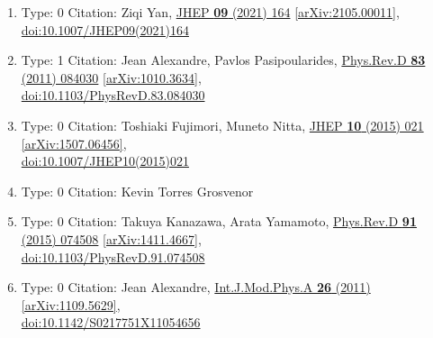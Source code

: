 \documentclass[a4paper,10pt]{article}
\begin{document}
\begin{enumerate}
\begin{enumerate}
  \item Type: 0 Citation: Ziqi Yan, \href{https://www.doi.org/10.1007/JHEP09(2021)164}{JHEP {\bf 09} (2021) 164}  \href{https://arxiv.org/abs/2105.00011}{[arXiv:2105.00011]},\\\href{https://www.doi.org/10.1007/JHEP09(2021)164}{doi:10.1007/JHEP09(2021)164}
  \item Type: 1 Citation: Jean Alexandre, Pavlos Pasipoularides, \href{https://www.doi.org/10.1103/PhysRevD.83.084030}{Phys.Rev.D {\bf 83} (2011) 084030}  \href{https://arxiv.org/abs/1010.3634}{[arXiv:1010.3634]},\\\href{https://www.doi.org/10.1103/PhysRevD.83.084030}{doi:10.1103/PhysRevD.83.084030}
  \item Type: 0 Citation: Toshiaki Fujimori, Muneto Nitta, \href{https://www.doi.org/10.1007/JHEP10(2015)021}{JHEP {\bf 10} (2015) 021}  \href{https://arxiv.org/abs/1507.06456}{[arXiv:1507.06456]},\\\href{https://www.doi.org/10.1007/JHEP10(2015)021}{doi:10.1007/JHEP10(2015)021}
  \item Type: 0 Citation: Kevin Torres Grosvenor
  \item Type: 0 Citation: Takuya Kanazawa, Arata Yamamoto, \href{https://www.doi.org/10.1103/PhysRevD.91.074508}{Phys.Rev.D {\bf 91} (2015) 074508}  \href{https://arxiv.org/abs/1411.4667}{[arXiv:1411.4667]},\\\href{https://www.doi.org/10.1103/PhysRevD.91.074508}{doi:10.1103/PhysRevD.91.074508}
  \item Type: 0 Citation: Jean Alexandre, \href{https://www.doi.org/10.1142/S0217751X11054656}{Int.J.Mod.Phys.A {\bf 26} (2011) }  \href{https://arxiv.org/abs/1109.5629}{[arXiv:1109.5629]},\\\href{https://www.doi.org/10.1142/S0217751X11054656}{doi:10.1142/S0217751X11054656}

\end{enumerate}
\end{enumerate}
\end{document}
